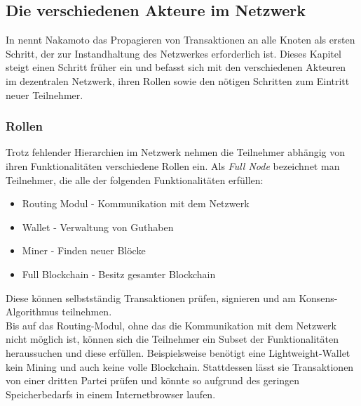 \subsection{Die verschiedenen Akteure im Netzwerk}
In \cite{nakamoto_2008} nennt Nakamoto das Propagieren von Transaktionen an alle Knoten als ersten Schritt, der zur Instandhaltung des Netzwerkes erforderlich ist. Dieses Kapitel steigt einen Schritt früher ein und befasst sich mit den verschiedenen Akteuren im dezentralen Netzwerk, ihren Rollen sowie den nötigen Schritten zum Eintritt neuer Teilnehmer.
\subsubsection{Rollen}
Trotz fehlender Hierarchien im Netzwerk nehmen die Teilnehmer abhängig von ihren Funktionalitäten verschiedene Rollen ein. Als \emph{Full Node} bezeichnet man Teilnehmer, die alle der folgenden Funktionalitäten erfüllen:
\begin{itemize}
	\item Routing Modul - Kommunikation mit dem Netzwerk
	\item Wallet - Verwaltung von Guthaben
	\item Miner - Finden neuer Blöcke
	\item Full Blockchain - Besitz gesamter Blockchain
\end{itemize}
Diese können selbstständig Transaktionen prüfen, signieren und am Konsens-Algorithmus teilnehmen.\\

Bis auf das Routing-Modul, ohne das die Kommunikation mit dem Netzwerk nicht möglich ist, können sich die Teilnehmer ein Subset der Funktionalitäten heraussuchen und diese erfüllen. 
Beispielsweise benötigt eine Lightweight-Wallet kein Mining und auch keine volle Blockchain. 
Stattdessen lässt sie Transaktionen von einer dritten Partei prüfen und könnte so aufgrund des geringen Speicherbedarfs in einem Internetbrowser laufen.

